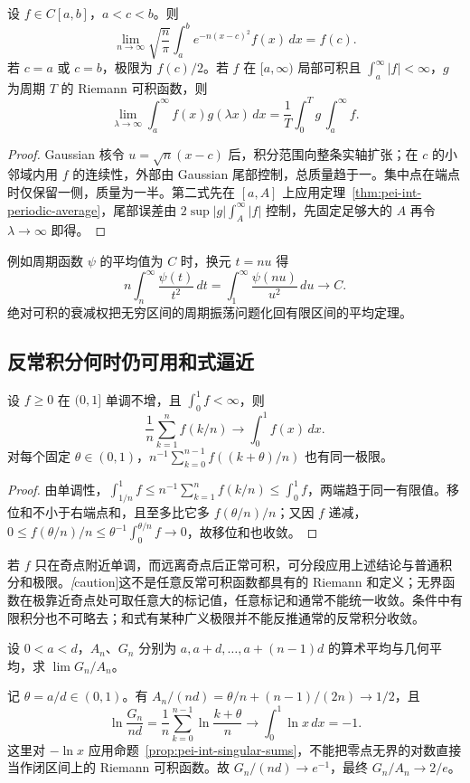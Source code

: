 \begin{proposition}
\label{prop:pei-int-gaussian-kernel}
设 $f\in C[a,b]$，$a<c<b$。则
\[
 \lim_{n\to\infty}\sqrt{\frac n\pi}\int_a^be^{-n(x-c)^2}f(x)\,dx=f(c).
\]
若 $c=a$ 或 $c=b$，极限为 $f(c)/2$。若 $f$ 在 $[a,\infty)$ 局部可积且 $\int_a^\infty|f|<\infty$，$g$ 为周期 $T$ 的 Riemann 可积函数，则
\[
 \lim_{\lambda\to\infty}\int_a^\infty f(x)g(\lambda x)\,dx
 =\frac1T\int_0^Tg\,\int_a^\infty f.
\]
\end{proposition}
\begin{proof}
Gaussian 核令 $u=\sqrt n(x-c)$ 后，积分范围向整条实轴扩张；在 $c$ 的小邻域内用 $f$ 的连续性，外部由 Gaussian 尾部控制，总质量趋于一。集中点在端点时仅保留一侧，质量为一半。第二式先在 $[a,A]$ 上应用定理~\ref{thm:pei-int-periodic-average}，尾部误差由 $2\sup|g|\int_A^\infty|f|$ 控制，先固定足够大的 $A$ 再令 $\lambda\to\infty$ 即得。
\end{proof}
例如周期函数 $\psi$ 的平均值为 $C$ 时，换元 $t=nu$ 得
\[
 n\int_n^\infty\frac{\psi(t)}{t^2}\,dt
 =\int_1^\infty\frac{\psi(nu)}{u^2}\,du\longrightarrow C.
\]
绝对可积的衰减权把无穷区间的周期振荡问题化回有限区间的平均定理。

\subsection{反常积分何时仍可用和式逼近}
\begin{proposition}
\label{prop:pei-int-singular-sums}
设 $f\ge0$ 在 $(0,1]$ 单调不增，且 $\int_0^1f<\infty$，则
\[
 \frac1n\sum_{k=1}^nf(k/n)\longrightarrow\int_0^1f(x)\,dx.
\]
对每个固定 $\theta\in(0,1)$，$n^{-1}\sum_{k=0}^{n-1}f((k+\theta)/n)$ 也有同一极限。
\end{proposition}
\begin{proof}
由单调性，$\int_{1/n}^1f\le n^{-1}\sum_{k=1}^nf(k/n)\le\int_0^1f$，两端趋于同一有限值。移位和不小于右端点和，且至多比它多 $f(\theta/n)/n$；又因 $f$ 递减，$0\le f(\theta/n)/n\le\theta^{-1}\int_0^{\theta/n}f\to0$，故移位和也收敛。
\end{proof}
若 $f$ 只在奇点附近单调，而远离奇点后正常可积，可分段应用上述结论与普通积分和极限。\emph[caution]{这不是任意反常可积函数都具有的 Riemann 和定义}；无界函数在极靠近奇点处可取任意大的标记值，任意标记和通常不能统一收敛。条件中有限积分也不可略去；和式有某种广义极限并不能反推通常的反常积分收敛。

\begin{example}
设 $0<a<d$，$A_n$、$G_n$ 分别为 $a,a+d,\ldots,a+(n-1)d$ 的算术平均与几何平均，求 $\lim G_n/A_n$。
\end{example}
\begin{solve}
记 $\theta=a/d\in(0,1)$。有 $A_n/(nd)=\theta/n+(n-1)/(2n)\to1/2$，且
\[
 \ln\frac{G_n}{nd}=\frac1n\sum_{k=0}^{n-1}\ln\frac{k+\theta}{n}
 \longrightarrow\int_0^1\ln x\,dx=-1.
\]
这里对 $-\ln x$ 应用命题~\ref{prop:pei-int-singular-sums}，不能把零点无界的对数直接当作闭区间上的 Riemann 可积函数。故 $G_n/(nd)\to e^{-1}$，最终 $G_n/A_n\to2/e$。
\end{solve}

